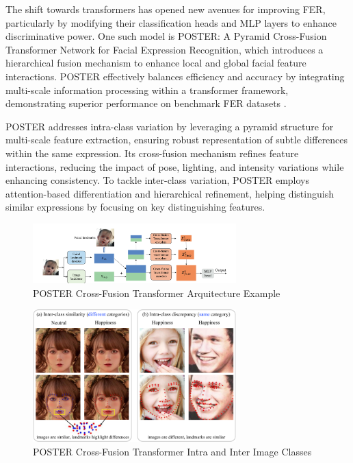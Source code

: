 The shift towards transformers has opened new avenues for improving FER, particularly by modifying their classification heads and MLP layers to enhance discriminative power.  One such model is POSTER: A Pyramid Cross-Fusion Transformer Network for Facial Expression Recognition, which introduces a hierarchical fusion mechanism to enhance local and global facial feature interactions. POSTER effectively balances efficiency and accuracy by integrating multi-scale information processing within a transformer framework, demonstrating superior performance on benchmark FER datasets \cite{zheng_poster_2022}.

POSTER addresses \gls{intra-class} variation by leveraging a pyramid structure for multi-scale feature extraction, ensuring robust representation of subtle differences within the same expression. Its cross-fusion mechanism refines feature interactions, reducing the impact of pose, lighting, and intensity variations while enhancing consistency. To tackle \gls{inter-class} variation, \gls{POSTER} employs attention-based differentiation and hierarchical refinement, helping distinguish similar expressions by focusing on key distinguishing features. 

\begin{figure}[H]
\centering
   \includegraphics[width=0.70\textwidth]{../images/poster_image.png}
\caption{POSTER Cross-Fusion Transformer Arquitecture Example}
\label{fig:poster_architecure_example}
\end{figure}


\begin{figure}[H]
\centering
   \includegraphics[width=0.70\textwidth]{../images/intra_inter_classes_images.png}
\caption{POSTER Cross-Fusion Transformer Intra and Inter Image Classes}
\label{fig:intra_inter_classes_images}
\end{figure}
	
